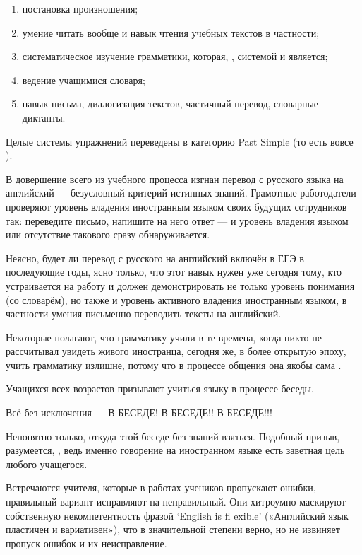 \begin{enumerate}
    \item постановка произношения;
    \item умение читать вообще и навык чтения учебных текстов в частности;
    \item систематическое изучение грамматики, которая, , системой и является;
    \item ведение учащимися словаря;
    \item навык письма, диалогизация текстов, частичный перевод, словарные диктанты.
\end{enumerate}

Целые системы упражнений переведены в категорию Past Simple (то есть вовсе ).

В довершение всего из учебного процесса изгнан перевод с русского языка на английский — безусловный критерий истинных знаний. Грамотные работодатели проверяют уровень владения иностранным языком своих будущих сотрудников так: переведите письмо, напишите на него ответ — и уровень владения языком или отсутствие такового сразу обнаруживается.

Неясно, будет ли перевод с русского на английский включён в ЕГЭ в последующие годы, ясно только, что этот навык нужен уже сегодня тому, кто устраивается на работу и должен демонстрировать не только уровень понимания (со словарём), но также и уровень активного владения иностранным языком, в частности умения письменно переводить тексты на английский.

Некоторые полагают, что грамматику учили в те времена, когда никто не рассчитывал увидеть живого иностранца, сегодня же, в более открытую эпоху, учить грамматику излишне, потому что в процессе общения она якобы сама .

Учащихся всех возрастов призывают учиться языку в процессе беседы.

Всё без исключения — В БЕСЕДЕ! В БЕСЕДЕ!! В БЕСЕДЕ!!!

Непонятно только, откуда этой беседе без знаний взяться. Подобный призыв, разумеется, , ведь именно говорение на иностранном языке есть заветная цель любого учащегося.

Встречаются учителя, которые в работах учеников пропускают ошибки, правильный вариант исправляют на неправильный. Они хитроумно маскируют собственную некомпетентность фразой ‘English is fl exible’ («Английский язык пластичен и вариативен»), что в значительной степени верно, но не извиняет пропуск ошибок и их неисправление.

